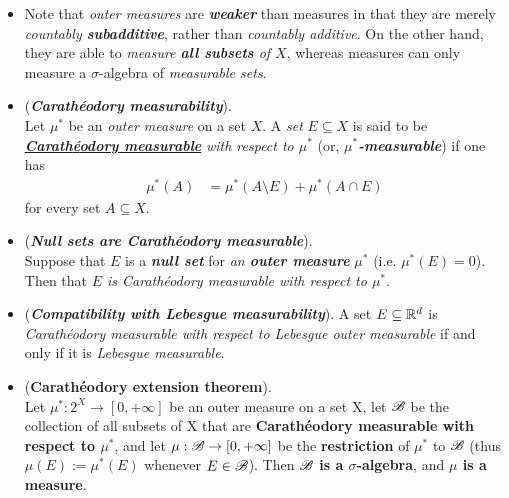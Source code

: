 \documentclass[11pt]{article}
\begin{document}
\begin{itemize}
\item \begin{remark}
Note that \emph{outer measures} are \emph{\textbf{weaker}} than measures in that they are merely \emph{countably \textbf{subadditive}}, rather than \emph{countably additive}. On the other hand, they are able to \emph{measure \textbf{all subsets} of $X$}, whereas measures can only measure a $\sigma$-algebra of \emph{measurable sets}.
\end{remark}


\item \begin{definition} (\emph{\textbf{Carath{\'e}odory measurability}}).\\
Let $\mu^{*}$ be an \emph{outer measure} on a set $X$. A \emph{set} $E \subseteq X$ is said to be \underline{\emph{\textbf{Carath{\'e}odory measurable}}} \emph{with respect to $\mu^{*}$} (or, \emph{\textbf{$\mu^{*}$-measurable}}) if one has
\begin{align*}
\mu^{*}(A) &= \mu^{*}(A \setminus E) + \mu^{*}(A \cap E)
\end{align*} for every set $A \subseteq X$.
\end{definition}

\item \begin{example} (\emph{\textbf{Null sets are Carath{\'e}odory measurable}}). \\
Suppose that $E$ is a \emph{\textbf{null set}} for \emph{an \textbf{outer measure}} $\mu^{*}$  (i.e. $\mu^{*}(E) = 0$).  Then 
that \emph{$E$ is Carath{\'e}odory measurable with respect to $\mu^{*}$}.
\end{example}

\item \begin{example} (\emph{\textbf{Compatibility with Lebesgue measurability}}). 
A set $E \subseteq {\mathbb R}^d$ is \emph{Carath\'eodory measurable with respect to Lebesgue outer measurable} if and only if it is \emph{Lebesgue measurable}.
\end{example}

\item \begin{theorem} (\textbf{Carath\'eodory extension theorem}). \citep{tao2011introduction} \\
Let $\mu^{*}: 2^X \rightarrow [0, +\infty]$ be an outer measure on a set X, let ${\mathscr B}$ be the collection of all subsets of X that are \textbf{Carath\'eodory measurable with respect to $\mu^{*}$}, and let $\mu: {\mathscr B} \rightarrow [0, +\infty]$ be the \textbf{restriction} of $\mu^{*}$ to ${\mathscr B}$ (thus $\mu(E) := \mu^{*}(E)$
whenever $E \in {\mathscr B}$). Then \textbf{${\mathscr B}$ is a $\sigma$-algebra}, and \textbf{$\mu$ is a measure}.
\end{theorem}


\end{itemize}
\end{document}
